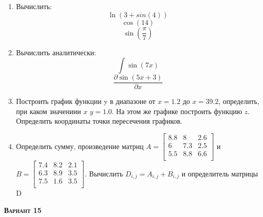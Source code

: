 \begin{enumerate}
\item Вычислить: 
\begin{equation*}\ln(3+sin(4))                     \end{equation*}
\begin{equation*}\cos(14)                          \end{equation*}
\begin{equation*}\sin \left( \dfrac{\pi}{7} \right)\end{equation*}

\item Вычислить аналитически: 
 \begin{equation*} \int \sin(7x)           \end{equation*}\begin{equation*} {\dfrac{\partial \sin(5 x +3)}{\partial x}} \end{equation*}
\item Построить график функции y в диапазоне от $x=1.2$ до $x=39.2$, определить, при каком значениии $x$ $y=1.0$. На этом же графике построить функцию $z $. Определить координаты точки пересечения графиков. \item Определить сумму, произведение матриц $A=\begin{bmatrix}
8.8 &8 &2.6 \\
6 &7.3 &2.5 \\
5.5 &8.8 &6.6 \\
\end{bmatrix}
$ и $B=\begin{bmatrix}
7.4 &8.2 &2.1 \\
6.3 &8.9 &3.5 \\
7.5 &1.6 &3.5 \\
\end{bmatrix}
$. Вычислить $D_{i,j}=A_{i,j} + B_{i,j}$ и определитель матрицы D
\end{enumerate}
\textsc{\textbf{Вариант 15}}

